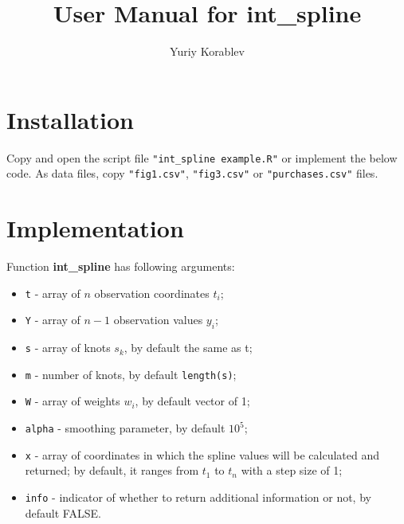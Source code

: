 \documentclass[a4paper,10pt]{article}
\begin{document}
	
\title{User Manual for \textbf{int\_spline}}
\author{Yuriy Korablev}

\maketitle


\section{Installation}
Copy and open the script file \lstinline|"int_spline example.R"| or implement the below code. 
As data files, copy \lstinline|"fig1.csv"|, \lstinline|"fig3.csv"| or \lstinline|"purchases.csv"| files.

\section{Implementation}
Function \textbf{int\_spline} has following arguments:
\begin{itemize}
	\item \lstinline|t| - array of $n$ observation coordinates $t_i$;
	\item \lstinline|Y| - array of $n-1$ observation values $y_i$;
	\item \lstinline|s| - array of knots $s_k$, by default the same as t;
	\item \lstinline|m| - number of knots, by default \lstinline|length(s)|;
	\item \lstinline|W| - array of weights $w_i$, by default vector of 1;
	\item \lstinline|alpha| - smoothing parameter, by default $10^5$;
	\item \lstinline|x| - array of coordinates in which the spline values will be calculated and returned; by default, it ranges from $t_1$ to $t_n$ with a step size of 1;
	\item \lstinline|info| - indicator of whether to return additional information or not, by default FALSE.
\end{itemize}
\end{document}
